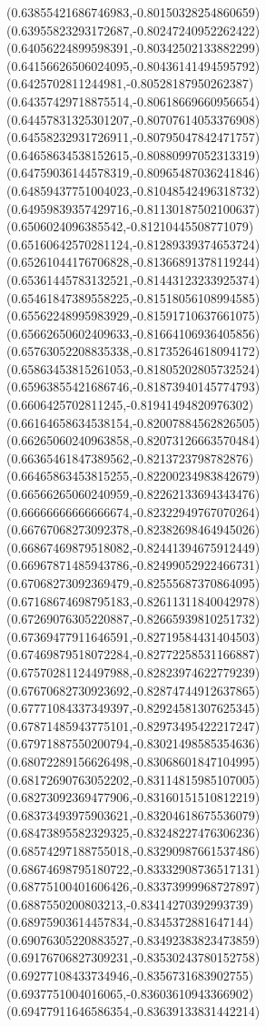 \documentclass[12pt]{article}
\theoremstyle{plain}
\theoremstyle{definition}
\theoremstyle{remark}
\begin{document}
\begin{figure}
{  (0.63855421686746983,-0.80150328254860659)%
  (0.63955823293172687,-0.80247240952262422)%
  (0.64056224899598391,-0.80342502133882299)%
  (0.64156626506024095,-0.80436141494595792)%
  (0.6425702811244981,-0.80528187950262387)%
  (0.64357429718875514,-0.80618669660956654)%
  (0.64457831325301207,-0.80707614053376908)%
  (0.64558232931726911,-0.80795047842471757)%
  (0.64658634538152615,-0.80880997052313319)%
  (0.64759036144578319,-0.80965487036241846)%
  (0.64859437751004023,-0.81048542496318732)%
  (0.64959839357429716,-0.81130187502100637)%
  (0.6506024096385542,-0.81210445508771079)%
  (0.65160642570281124,-0.81289339374653724)%
  (0.65261044176706828,-0.81366891378119244)%
  (0.65361445783132521,-0.81443123233925374)%
  (0.65461847389558225,-0.81518056108994585)%
  (0.65562248995983929,-0.81591710637661075)%
  (0.65662650602409633,-0.81664106936405856)%
  (0.65763052208835338,-0.81735264618094172)%
  (0.65863453815261053,-0.81805202805732524)%
  (0.65963855421686746,-0.81873940145774793)%
  (0.6606425702811245,-0.81941494820976302)%
  (0.66164658634538154,-0.82007884562826505)%
  (0.66265060240963858,-0.82073126663570484)%
  (0.66365461847389562,-0.8213723798782876)%
  (0.66465863453815255,-0.82200234983842679)%
  (0.66566265060240959,-0.82262133694343476)%
  (0.66666666666666674,-0.82322949767070264)%
  (0.66767068273092378,-0.82382698464945026)%
  (0.66867469879518082,-0.82441394675912449)%
  (0.66967871485943786,-0.82499052922466731)%
  (0.67068273092369479,-0.82555687370864095)%
  (0.67168674698795183,-0.82611311840042978)%
  (0.67269076305220887,-0.82665939810251732)%
  (0.67369477911646591,-0.82719584431404503)%
  (0.67469879518072284,-0.82772258531166887)%
  (0.67570281124497988,-0.82823974622779239)%
  (0.67670682730923692,-0.82874744912637865)%
  (0.67771084337349397,-0.82924581307625345)%
  (0.67871485943775101,-0.82973495422217247)%
  (0.67971887550200794,-0.83021498585354636)%
  (0.68072289156626498,-0.83068601847104995)%
  (0.68172690763052202,-0.83114815985107005)%
  (0.68273092369477906,-0.83160151510812219)%
  (0.68373493975903621,-0.83204618675536079)%
  (0.68473895582329325,-0.83248227476306236)%
  (0.68574297188755018,-0.83290987661537486)%
  (0.68674698795180722,-0.83332908736517131)%
  (0.68775100401606426,-0.83373999968727897)%
  (0.6887550200803213,-0.83414270392993739)%
  (0.68975903614457834,-0.8345372881647144)%
  (0.69076305220883527,-0.83492383823473859)%
  (0.69176706827309231,-0.83530243780152758)%
  (0.69277108433734946,-0.8356731683902755)%
  (0.6937751004016065,-0.83603610943366902)%
  (0.69477911646586354,-0.83639133831442214)%
}
\end{figure}
\end{document}
